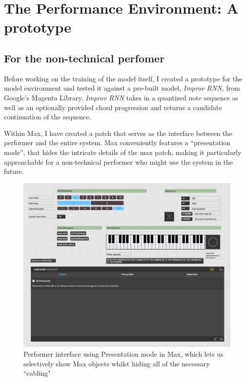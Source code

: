\documentclass[../main.tex]{subfiles}
\begin{document}
\newpage

\chapter{The Performance Environment: A prototype}

\section{For the non-technical perfomer}
Before working on the training of the model itself, I created a prototype for the model environment and tested it against a pre-built model, \textit{Improv RNN}, from Google's Magenta Library. \textit{Improv RNN} takes in a quantized note sequence as well as an optionally provided chord progression and returns a candidate continuation of the sequence.

Within Max, I have created a patch that serves as the interface between the performer and the entire system. Max conveniently features a ``presentation mode'', that hides the intricate details of the max patch, making it particularly approachable for a non-technical performer who might use the system in the future. 

\begin{figure}[htpb]
    \centering
    \includegraphics[width=1\textwidth]{imgs/performer_interface.png}
    \caption{Performer interface using Presentation mode in Max, which lets us selectively show Max objects whilst hiding all of the necessary ``cabling" }
    \label{fig:performer_interface}
\end{figure}
\end{document}
